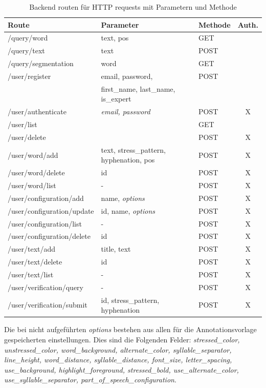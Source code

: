 \begin{table}[h!]
	\centering
	\begin{tabular}{|l|l|l|c|}
		\hline
		\textbf{Route} & \textbf{Parameter} & \textbf{Methode} & \textbf{Auth.}\\
		\hline
		\hline
		/query/word & text, pos & GET & \\
		\hline
		/query/text & text & POST & \\
		\hline
		/query/segmentation& word & GET & \\
		\hline
		\hline
		/user/register & email, password, & POST & \\
		& first\_name, last\_name, is\_expert &&\\
		\hline
		/user/authenticate & \textit{email, password} & POST & X\\
		\hline
		/user/list & \todo{remove} & GET & \\
		\hline
		/user/delete & \todo{implement} & POST & X\\
		\hline
		\hline
		/user/word/add& text, stress\_pattern, hyphenation, pos & POST & X\\
		\hline
		/user/word/delete& id & POST & X\\
		\hline
		/user/word/list & - & POST & X\\
		\hline
		\hline
		/user/configuration/add & name, \textit{options} & POST & X\\
		\hline
		/user/configuration/update & id, name, \textit{options}  & POST & X\\
		\hline
		/user/configuration/list & - & POST & X\\
		\hline
		/user/configuration/delete & id & POST & X\\
		\hline
		\hline
		/user/text/add & title, text & POST & X\\
		\hline
		/user/text/delete & id & POST & X\\
		\hline
		/user/text/list & - & POST & X\\
		\hline
		\hline
		/user/verification/query & - & POST & X\\
		\hline
		/user/verification/submit & id, stress\_pattern, hyphenation & POST & X\\
		\hline
	\end{tabular}
	\caption{Backend routen für HTTP requests mit Parametern und Methode}
	\label{table:backendroutes}
\end{table}

Die bei  nicht aufgeführten \textit{options} bestehen aus allen für die Annotationsvorlage gespeicherten einstellungen. Dies sind die Folgenden Felder: \textit{stressed\_color, unstressed\_color, word\_background, alternate\_color, syllable\_separator, line\_height, word\_distance, syllable\_distance, font\_size, letter\_spacing, use\_background, highlight\_foreground, stressed\_bold, use\_alternate\_color, use\_syllable\_separator, part\_of\_speech\_configuration}.

